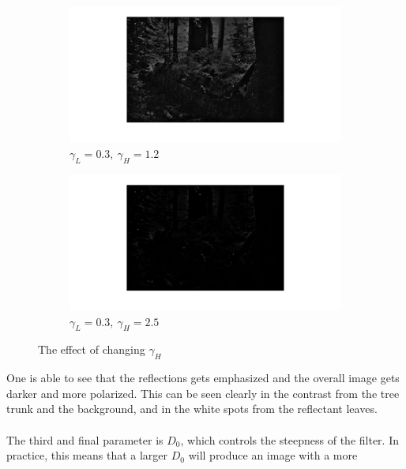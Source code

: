 		\begin{figure}[h!]
			\centering
			\begin{subfigure}[b]{0.5\textwidth}
				\includegraphics[width=\textwidth]{pics/non_emph_high_frequnces.png}
				\caption{$\gamma_L = 0.3,~\gamma_H = 1.2$}
				\label{fig:high_freq_non_emph}
			\end{subfigure}%
			\hfill	
			\begin{subfigure}[b]{0.5\textwidth}
				\includegraphics[width=\textwidth]{pics/emph_high_frequnces.png}
				\caption{$\gamma_L = 0.3,~\gamma_H = 2.5$}
				\label{fig:high_freq_emph}
			\end{subfigure}
			\label{fig:high_gamma}
		\caption{The effect of changing $\gamma_H$}				
		\end{figure}		
		One is able to see that the reflections gets emphasized and the overall
		image gets darker and more polarized. This can be seen clearly in the contrast from the
		tree trunk and the background, and in the white spots from the reflectant leaves.
		\\
		\\
		The third and final parameter is $D_0$, which controls the steepness of the filter.
		In practice, this means that a larger $D_0$ will produce an image with a more 
